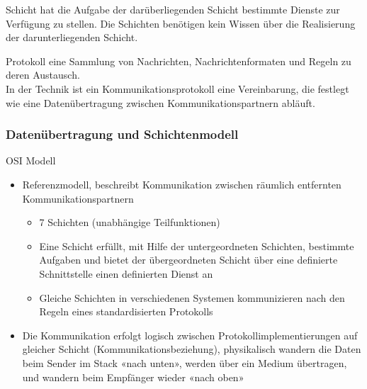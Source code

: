 \begin{definition}{Schicht}
    hat die Aufgabe der darüberliegenden Schicht bestimmte Dienste zur Verfügung zu stellen. Die Schichten benötigen kein Wissen über die Realisierung der darunterliegenden Schicht.
\end{definition}

\begin{definition}{Protokoll}
     eine Sammlung von Nachrichten, Nachrichtenformaten und Regeln zu deren Austausch.\\
     In der Technik ist ein Kommunikationsprotokoll eine Vereinbarung, die festlegt wie eine Datenübertragung zwischen Kommunikationspartnern abläuft.
\end{definition}

\columnbreak

\subsubsection{Datenübertragung und Schichtenmodell}

\begin{concept}{OSI Modell}
    \begin{itemize}
        \item Referenzmodell, beschreibt Kommunikation zwischen räumlich entfernten Kommunikationspartnern
        \begin{itemize}
            \item 7 Schichten (unabhängige Teilfunktionen)
            \item Eine Schicht erfüllt, mit Hilfe der untergeordneten Schichten, bestimmte Aufgaben und bietet der übergeordneten Schicht über eine definierte Schnittstelle einen definierten Dienst an
            \item Gleiche Schichten in verschiedenen Systemen kommunizieren nach den Regeln eines standardisierten Protokolls
        \end{itemize}
        \item Die Kommunikation erfolgt logisch zwischen Protokollimplementierungen auf gleicher Schicht (Kommunikationsbeziehung), physikalisch wandern die Daten beim Sender im Stack «nach unten», werden über ein Medium übertragen, und wandern beim Empfänger wieder «nach oben»
    \end{itemize}
\end{concept}

